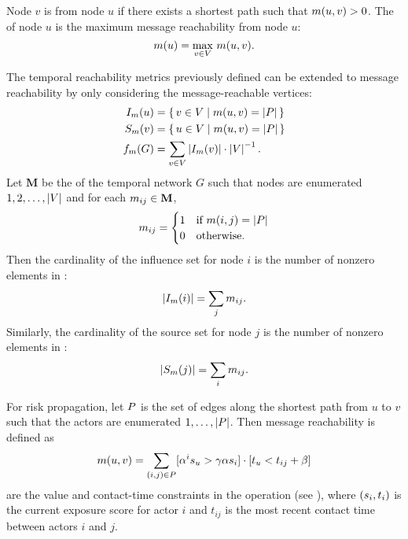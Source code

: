 Node $v$ is  from node $u$ if there exists a shortest path such that $m(u, v) > 0$. The  of node $u$ is the maximum message reachability from node $u$:
%
\begin{equation}\label{eq:vreach}
	m(u) = \max_{v \in V} \, m(u, v).
\end{equation}

The temporal reachability metrics previously defined can be extended to message reachability by only considering the message-reachable vertices:
%
\begin{align*}
	I_m(u) &= \set{ v \in V| m(u, v) = \left\vert P\right\vert} \\
	S_m(v) &= \set{ u \in V| m(u, v) = \left\vert P\right\vert} \\
	f_m(G) &= \sum_{v \in V} \left\vert I_m(v) \right\vert \cdot \left\vert V \right\vert^{-1}.
\end{align*}
%
Let $\mathbf{M}$ be the  of the temporal network $G$ such that nodes are enumerated $1, 2, \ldots, \left\vert V \right\vert$ and for each $m_{ij} \in \mathbf{M}$,
%
\begin{equation*}
	m_{ij} = 
	   \begin{cases}
        	1 & \text{if } m(i, j) = \left\vert P \right\vert \\
        	0 & \text{otherwise.}
	   \end{cases}
\end{equation*}
%
Then the cardinality of the influence set for node $i$ is the number of nonzero elements in :
%
\begin{equation}\label{eq:influence-size}
	\left\vert I_m(i) \right\vert = \sum_j m_{ij} .
\end{equation}
%
Similarly, the cardinality of the source set for node $j$ is the number of nonzero elements in :
%
\begin{equation}\label{eq:source-size}
	\left\vert S_m(j) \right\vert = \sum_i m_{ij} .
\end{equation}

For risk propagation, let $P$ is the set of edges along the shortest path from $u$ to $v$ such that the actors are enumerated $1, \ldots, \left\vert P \right\vert$. Then message reachability is defined as
%
\begin{equation}\label{eq:reach}
    m(u, v) = \sum_{(i, j) \in P} [\alpha^{i} s_u > \gamma \alpha s_i] \cdot [t_u < t_{ij} + \beta]
\end{equation}
%
are the value and contact-time constraints in the \cShouldReceive[] operation (see ), where $(s_i, t_i)$ is the current exposure score for actor $i$ and $t_{ij}$ is the most recent contact time between actors $i$ and $j$.

